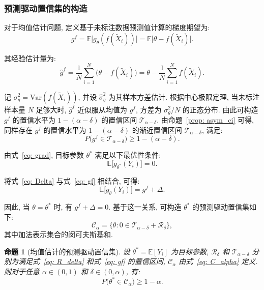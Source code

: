 \documentclass[a4paper, AutoFakeBold, UTF8]{ctexrep}
\theoremstyle{plain}
\newtheorem{prop}{命题}[chapter]
\numberwithin{equation}{chapter}
\begin{document}
\subsubsection{预测驱动置信集的构造}

对于均值估计问题, 定义基于未标注数据预测值计算的梯度期望为: 
\begin{equation}
g^f = \mathbb{E}\bigl[g_{\theta} (f (\tilde{X}_i) ) \bigr] = \mathbb{E}\bigl[\theta - f (\tilde{X}_i) \bigr]. \label{eq: gf}
\end{equation}

其经验估计量为: 
\begin{equation}
\hat{g}^f = \frac{1}{N}\sum_{i=1}^{N} \bigl (\theta - f (\tilde{X}_i) \bigr)  = \theta - \frac{1}{N}\sum_{i=1}^{N} f (\tilde{X}_i). \label{eq: hat_gf}
\end{equation}

记 $\sigma_g^2 = \mathrm{Var} (f (\tilde{X}_i) ) $, 并设 $\hat{\sigma}_g^2$ 为其样本方差估计. 根据中心极限定理, 当未标注样本量 $N$ 足够大时, $\hat{g}^f$ 近似服从均值为 $g^f$, 方差为 $\sigma_g^2/N$ 的正态分布. 由此可构造 $g^f$ 的置信水平为 $1- (\alpha-\delta) $ 的置信区间 $\mathcal{T}_{\alpha-\delta}$. 由命题~\ref{prop: asym_ci} 可得, 同样存在 $g^f$ 的置信水平为 $1- (\alpha-\delta) $ 的渐近置信区间 $\mathcal{T}_{\alpha-\delta}$, 满足: 
\begin{equation}
P\bigl (g^f \in \mathcal{T}_{\alpha-\delta}\bigr)  \geq 1 -  (\alpha - \delta). \label{eq: T_alpha_delta}
\end{equation}

由式~\eqref{eq: grad}, 目标参数 $\theta^*$ 满足以下最优性条件: 
\begin{equation}
\mathbb{E}\bigl[g_{\theta^*} (Y_i) \bigr] = 0. \label{eq: optimality}
\end{equation}

将式~\eqref{eq: Delta} 与式~\eqref{eq: gf} 相结合, 可得: 
\begin{equation}
\mathbb{E}\bigl[g_{\theta} (Y_i) \bigr] = g^f + \Delta. \label{eq: relation}
\end{equation}

因此, 当 $\theta = \theta^*$ 时, 有 $g^f + \Delta = 0$. 基于这一关系, 可构造 $\theta^*$ 的预测驱动置信集如下: 
\begin{equation}
\mathcal{C}_{\alpha} = \bigl\{ \theta : 0 \in \mathcal{T}_{\alpha-\delta} + \mathcal{R}_{\delta} \bigr\}, \label{eq: C_alpha}
\end{equation}
其中加法表示集合的闵可夫斯基和. 


\begin{prop}[均值估计的预测驱动置信集]\label{prop: mean_ppi}
设 $\theta^* = \mathbb{E}[Y_i]$ 为目标参数, $\mathcal{R}_{\delta}$ 和 $\mathcal{T}_{\alpha-\delta}$ 分别为满足式~\eqref{eq: R_delta} 和式~\eqref{eq: gf} 的置信区间, $\mathcal{C}_{\alpha}$ 由式~\eqref{eq: C_alpha} 定义. 则对于任意 $\alpha \in  (0, 1) $ 和 $\delta \in  (0, \alpha) $, 有: 
\begin{equation}
P\bigl (\theta^* \in \mathcal{C}_{\alpha}\bigr)  \geq 1 - \alpha. \label{eq: mean_ppi_coverage}
\end{equation} 
\end{prop}
\end{document}
